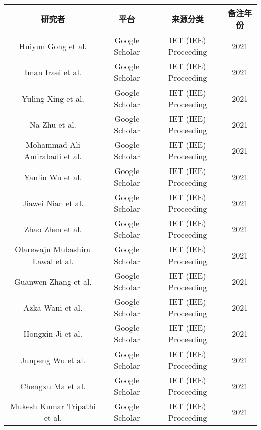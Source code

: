 \begin{center}
\begin{tabular}{cccc}
\hline
研究者 & 平台 & 来源分类 & 备注年份  \\
\hline
Huiyun Gong et al. \cite{huiyungong2021} & Google Scholar & IET (IEE) Proceeding & 2021 \\
Iman Iraei et al. \cite{imaniraei2021} & Google Scholar & IET (IEE) Proceeding & 2021 \\
Yuling Xing et al. \cite{yulingxing2021} & Google Scholar & IET (IEE) Proceeding & 2021 \\
Na Zhu et al. \cite{nazhu2021} & Google Scholar & IET (IEE) Proceeding & 2021 \\
Mohammad Ali Amirabadi et al. \cite{mohammadaliamirabadi2021} & Google Scholar & IET (IEE) Proceeding & 2021 \\
Yanlin Wu et al. \cite{yanlinwu2021} & Google Scholar & IET (IEE) Proceeding & 2021 \\
Jiawei Nian et al. \cite{jiaweinian2021} & Google Scholar & IET (IEE) Proceeding & 2021 \\
Zhao Zhen et al. \cite{zhaozhen2021} & Google Scholar & IET (IEE) Proceeding & 2021 \\
Olarewaju Mubashiru Lawal et al. \cite{olarewaju2021} & Google Scholar & IET (IEE) Proceeding & 2021 \\
Guanwen Zhang et al. \cite{guanwenzhang2021} & Google Scholar & IET (IEE) Proceeding & 2021 \\
Azka Wani et al. \cite{azkawani2021} & Google Scholar & IET (IEE) Proceeding & 2021 \\
Hongxin Ji et al. \cite{hongxinji2021} & Google Scholar & IET (IEE) Proceeding & 2021 \\
Junpeng Wu et al. \cite{junpengwu2021} & Google Scholar & IET (IEE) Proceeding & 2021 \\
Chengxu Ma et al. \cite{chengxuma2021} & Google Scholar & IET (IEE) Proceeding & 2021 \\
Mukesh Kumar Tripathi et al. \cite{mukeshkumar2021} & Google Scholar & IET (IEE) Proceeding & 2021 \\
\hline
\end{tabular}
\end{center}

